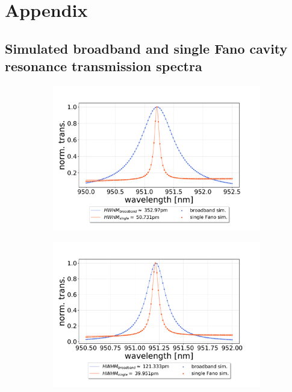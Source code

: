 \section{Appendix}

\subsection{Simulated broadband and single Fano cavity resonance transmission spectra}

\begin{figure}[h!]
    \centering
    \begin{subfigure}[b]{0.49\textwidth}
        \includegraphics[width=\textwidth]{figures/sim_single_vs_broadband_10um.pdf}
        \caption{}
        \label{fig:single_vs_broadband_simulation_10um}
    \end{subfigure}
    \begin{subfigure}[b]{0.49\textwidth}
        \includegraphics[width=\textwidth]{figures/sim_single_vs_broadband_30um.pdf}

\end{subfigure}
\end{figure}
